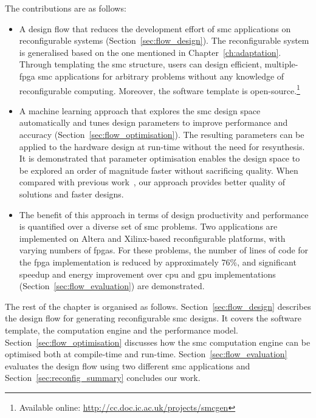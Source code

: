 The contributions are as follows:
\begin{itemize}
\item A design flow that reduces the development effort of \gls{smc} applications on reconfigurable systems (Section~\ref{sec:flow_design}).
The reconfigurable system is generalised based on the one mentioned in Chapter~\ref{ch:adaptation}.
Through templating the \gls{smc} structure, users can design efficient, multiple-\gls{fpga} \gls{smc} applications for arbitrary problems without any knowledge of reconfigurable computing.
Moreover, the software template is open-source.\footnote{Available online: \url{http://cc.doc.ic.ac.uk/projects/smcgen}}
\item A machine learning approach that explores the \gls{smc} design space automatically and tunes design parameters to improve performance and accuracy (Section~\ref{sec:flow_optimisation}). The resulting parameters can be applied to the hardware design at run-time without the need for resynthesis.
It is demonstrated that parameter optimisation enables the design space to be explored an order of magnitude faster without sacrificing quality.
When compared with previous work~\cite{chau14trets,chau13acm},
our approach provides better quality of solutions and faster designs.
\item The benefit of this approach in terms of design productivity and performance is quantified over a diverse set of \gls{smc} problems.
Two applications are implemented on Altera and Xilinx-based reconfigurable platforms, with varying numbers of \glspl{fpga}. For these problems, the number of lines of code for the \gls{fpga} implementation is reduced by approximately 76\%, and 
significant speedup and energy improvement over \gls{cpu} and \gls{gpu} implementations (Section~\ref{sec:flow_evaluation}) are demonstrated.
\end{itemize}

The rest of the chapter is organised as follows.
Section~\ref{sec:flow_design} describes the design flow for generating reconfigurable \gls{smc} designs.
It covers the software template, the computation engine and the performance model.
Section~\ref{sec:flow_optimisation} discusses how the \gls{smc} computation engine can be optimised both at compile-time and run-time.
Section~\ref{sec:flow_evaluation} evaluates the design flow using two different \gls{smc} applications and 
Section~\ref{sec:reconfig_summary} concludes our work.


